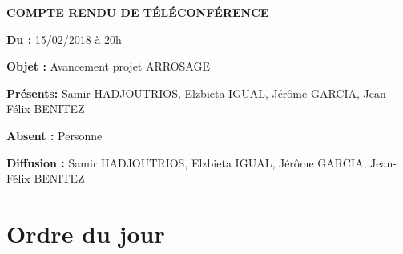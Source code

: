 \documentclass[11pt,a4paper,french,twoside,openright]{article}
\begin{document}
\pagestyle{fancy}

\begin{center}\bfseries\huge
COMPTE RENDU DE TÉLÉCONFÉRENCE %
\end{center}

\small

\textbf{Du :} 15/02/2018 à 20h

\textbf{Objet :} Avancement projet ARROSAGE

\textbf{Présents:} Samir HADJOUTRIOS, Elzbieta IGUAL, Jérôme GARCIA, Jean-Félix BENITEZ

\textbf{Absent :} Personne

\textbf{Diffusion :} Samir HADJOUTRIOS, Elzbieta IGUAL, Jérôme GARCIA, Jean-Félix BENITEZ
\normalsize

\hrulefill

\section{Ordre du jour}
\end{document}
